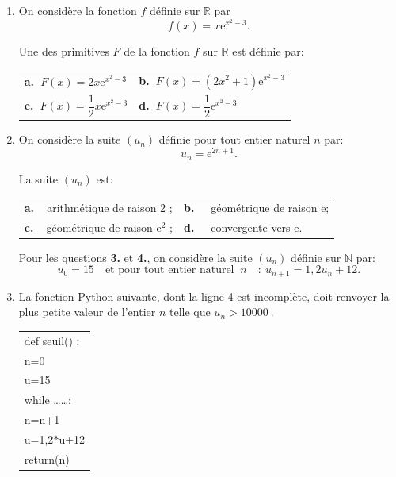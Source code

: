 \documentclass[10pt]{article}
\providecommand{\R}{\mathbb{R}}
\providecommand{\N}{\mathbb{N}}
\providecommand{\e}{{\mathrm{e}}}
\providecommand{\np}[2][]{{#2~#1}}
\begin{document}
\begin{enumerate}
\item On considère la fonction $f$ définie sur $\R$ par 
\[f(x) = x \e^{x^2 - 3}.\]

Une des primitives $F$ de la fonction $f$ sur $\R$ est définie par:
\begin{center}
\begin{tabularx}{\linewidth}{*{2}{X}}
\textbf{a.~}$F(x) = 2x\e^{x^2 - 3}$&\textbf{b.~}$F(x) = \left(2x^2 + 1\right)\e^{x^2 - 3}$\\
\textbf{c.~}$F(x) = \dfrac12 x\e^{x^2 - 3}$&\textbf{d.~}$F(x) = \dfrac12 \e^{x^2 - 3}$
\end{tabularx}
\end{center}

\item On considère la suite $\left(u_n\right)$ définie pour tout entier naturel $n$ par: \[u_n = \e^{2n+1}.\]

La suite $\left(u_n\right)$ est:

\begin{center}
\begin{tabularx}{\linewidth}{*{2}{X}}
\textbf{a.~~}arithmétique de raison 2 ; &\textbf{b.~~} géométrique de raison e;\\
\textbf{c.~~}géométrique de raison e$^2$ ; &\textbf{d.~~} convergente vers e. 
\end{tabularx}
\end{center}

Pour les questions \textbf{3.} et \textbf{4.}, on considère la suite $\left(u_n\right)$ définie sur $\N$ par:
\[u_0 = 15 \quad \text{et pour tout entier naturel }\: n \quad :\: u_{n+1} = 1,2u_n + 12.\]

\item La fonction Python suivante, dont la ligne 4 est incomplète, doit renvoyer la plus petite valeur de l'entier $n$ telle que $u_n > \np{10000}$.

\begin{center}
\begin{tabular}{|>{\ttfamily}l|}\hline
def seuil() :\\
\qquad n=0\\
\qquad u=15\\
\qquad while \ldots \ldots:\\
\qquad \quad n=n+1\\
\qquad \quad u=1,2$*$u+12\\
\qquad return(n)\\ \hline
\end{tabular}
\end{center}


\end{enumerate}
\end{document}
